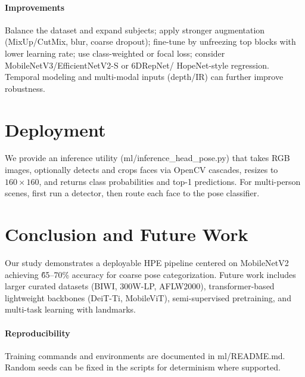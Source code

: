 \documentclass[11pt]{article}
\begin{document}
\paragraph{Improvements} Balance the dataset and expand subjects; apply stronger augmentation (MixUp/CutMix, blur, coarse dropout); fine-tune by unfreezing top blocks with lower learning rate; use class-weighted or focal loss; consider MobileNetV3/EfficientNetV2-S or 6DRepNet/ HopeNet-style regression. Temporal modeling and multi-modal inputs (depth/IR) can further improve robustness.

\section{Deployment}
We provide an inference utility (ml/inference\_head\_pose.py) that takes RGB images, optionally detects and crops faces via OpenCV cascades, resizes to $160\times160$, and returns class probabilities and top-1 predictions. For multi-person scenes, first run a detector, then route each face to the pose classifier.

\section{Conclusion and Future Work}
Our study demonstrates a deployable HPE pipeline centered on MobileNetV2 achieving \~65--70\% accuracy for coarse pose categorization. Future work includes larger curated datasets (BIWI, 300W-LP, AFLW2000), transformer-based lightweight backbones (DeiT-Ti, MobileViT), semi-supervised pretraining, and multi-task learning with landmarks.

\paragraph{Reproducibility} Training commands and environments are documented in ml/README.md. Random seeds can be fixed in the scripts for determinism where supported.



\end{document}
